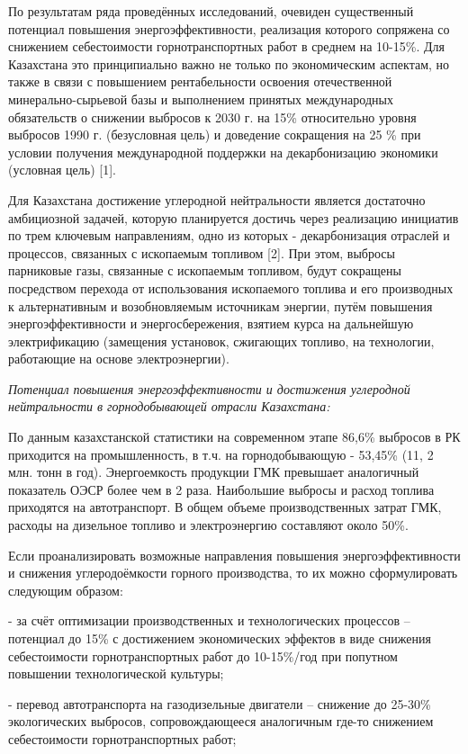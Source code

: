 По результатам ряда проведённых исследований, очевиден существенный
потенциал повышения энергоэффективности, реализация которого сопряжена
со снижением себестоимости горнотранспортных работ в среднем на 10-15\%.
Для Казахстана это принципиально важно не только по экономическим
аспектам, но также в связи с повышением рентабельности освоения
отечественной минерально-сырьевой базы и выполнением принятых
международных обязательств о снижении выбросов к 2030 г. на 15\%
относительно уровня выбросов 1990 г. (безусловная цель) и доведение
сокращения на 25 \% при условии получения международной поддержки на
декарбонизацию экономики (условная цель) {[}1{]}.

Для Казахстана достижение углеродной нейтральности является достаточно
амбициозной задачей, которую планируется достичь через реализацию
инициатив по трем ключевым направлениям, одно из которых -
декарбонизация отраслей и процессов, связанных с ископаемым топливом
{[}2{]}. При этом, выбросы парниковые газы, связанные с ископаемым
топливом, будут сокращены посредством перехода от использования
ископаемого топлива и его производных к альтернативным и возобновляемым
источникам энергии, путём повышения энергоэффективности и
энергосбережения, взятием курса на дальнейшую электрификацию (замещения
установок, сжигающих топливо, на технологии, работающие на основе
электроэнергии).

\emph{Потенциал повышения энергоэффективности и достижения углеродной
нейтральности в горнодобывающей отрасли Казахстана:}

По данным казахстанской статистики на современном этапе 86,6\% выбросов
в РК приходится на промышленность, в т.ч. на горнодобывающую - 53,45\%
(11, 2 млн. тонн в год). Энергоемкость продукции ГМК превышает
аналогичный показатель ОЭСР более чем в 2 раза. Наибольшие выбросы и
расход топлива приходятся на автотранспорт. В общем объеме
производственных затрат ГМК, расходы на дизельное топливо и
электроэнергию составляют около 50\%.

Если проанализировать возможные направления повышения
энергоэффективности и снижения углеродоёмкости горного производства, то
их можно сформулировать следующим образом:

- за счёт оптимизации производственных и технологических процессов --
потенциал до 15\% с достижением экономических эффектов в виде снижения
себестоимости горнотранспортных работ до 10-15\%/год при попутном
повышении технологической культуры;

- перевод автотранспорта на газодизельные двигатели -- снижение до
25-30\% экологических выбросов, сопровождающееся аналогичным где-то
снижением себестоимости горнотранспортных работ;

